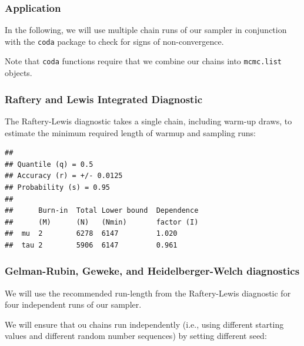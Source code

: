 \documentclass[
  11pt,
]{article}
\begin{document}
\hypertarget{application-1}{%
\subsubsection{Application}\label{application-1}}

In the following, we will use multiple chain runs of our sampler in conjunction with the \texttt{coda} package to check for signs of non-convergence.

Note that \texttt{coda} functions require that we combine our chains into \texttt{mcmc.list} objects.

\hypertarget{raftery-and-lewis-integrated-diagnostic}{%
\subsubsection{Raftery and Lewis Integrated Diagnostic}\label{raftery-and-lewis-integrated-diagnostic}}

The Raftery-Lewis diagnostic takes a single chain, including warm-up draws, to estimate the minimum required length of warmup and sampling runs:

\begin{verbatim}
## 
## Quantile (q) = 0.5
## Accuracy (r) = +/- 0.0125
## Probability (s) = 0.95 
##                                            
##      Burn-in  Total Lower bound  Dependence
##      (M)      (N)   (Nmin)       factor (I)
##  mu  2        6278  6147         1.020     
##  tau 2        5906  6147         0.961
\end{verbatim}

\hypertarget{gelman-rubin-geweke-and-heidelberger-welch-diagnostics}{%
\subsubsection{Gelman-Rubin, Geweke, and Heidelberger-Welch diagnostics}\label{gelman-rubin-geweke-and-heidelberger-welch-diagnostics}}

We will use the recommended run-length from the Raftery-Lewis diagnostic for
four independent runs of our sampler.

We will ensure that ou chains run independently (i.e., using different starting values and different random number sequences) by setting different seed:
\end{document}
